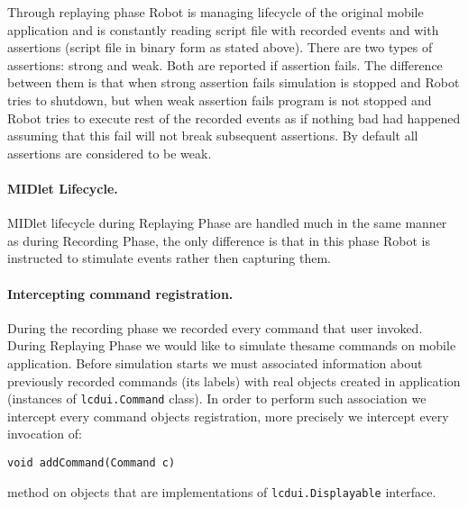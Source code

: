 \documentclass[a4paper,10pt,oneside,final]{dweiss-technote}
\begin{document}
Through replaying phase Robot is managing lifecycle of the original mobile application and is
constantly reading script file with recorded events and with assertions (script file in binary form
as stated above). There are two types of assertions: strong and weak. Both are reported if assertion
fails. The difference between them is that when strong assertion fails simulation is stopped and
Robot tries to shutdown, but when weak assertion fails program is not stopped and Robot tries to
execute rest of the recorded events as if nothing bad had happened assuming that this fail will not
break subsequent assertions. By default all assertions are considered to be weak.


\paragraph*{MIDlet Lifecycle.}
MIDlet lifecycle during Replaying Phase are handled much in the same manner as during Recording
Phase, the only difference is that in this phase Robot is instructed to stimulate events rather then
capturing them.

\paragraph*{Intercepting command registration.}

During the recording phase we recorded every command that user invoked. During Replaying Phase we
would like to simulate thesame commands on mobile application. Before simulation starts we must
associated information about previously recorded commands (its labels) with real objects created in
application (instances of \texttt{lcdui.Command} class). In order to perform such
association we intercept every command objects registration, more precisely we intercept every
invocation of:

\begin{Verbatim}
void addCommand(Command c)
\end{Verbatim}

\noindent%
method on objects that are implementations of \texttt{lcdui.Displayable} interface.
\end{document}
